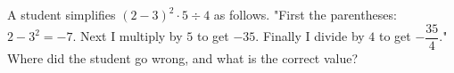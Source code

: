A student simplifies $(2-3)^2\cdot5\div4$ as follows. "First the parentheses: $2-3^2=-7$. Next I multiply by $5$ to get $-35$. Finally I divide by $4$ to get $-\dfrac{35}{4}$." Where did the student go wrong, and what is the correct value?
